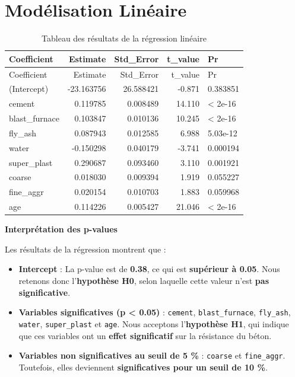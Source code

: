 \documentclass[
  12pt,
]{article}
\providecommand{\tightlist}{%
  \setlength{\itemsep}{0pt}\setlength{\parskip}{0pt}}
\begin{document}
\newpage

\section{Modélisation Linéaire}\label{moduxe9lisation-linuxe9aire}

\begin{longtable}[]{@{}lrrrl@{}}
\caption{Tableau des résultats de la régression linéaire}\tabularnewline
\toprule\noalign{}
Coefficient & Estimate & Std\_Error & t\_value & Pr \\
\midrule\noalign{}
\endfirsthead
\toprule\noalign{}
Coefficient & Estimate & Std\_Error & t\_value & Pr \\
\midrule\noalign{}
\endhead
\bottomrule\noalign{}
\endlastfoot
(Intercept) & -23.163756 & 26.588421 & -0.871 & 0.383851 \\
cement & 0.119785 & 0.008489 & 14.110 & \textless{} 2e-16 \\
blast\_furnace & 0.103847 & 0.010136 & 10.245 & \textless{} 2e-16 \\
fly\_ash & 0.087943 & 0.012585 & 6.988 & 5.03e-12 \\
water & -0.150298 & 0.040179 & -3.741 & 0.000194 \\
super\_plast & 0.290687 & 0.093460 & 3.110 & 0.001921 \\
coarse & 0.018030 & 0.009394 & 1.919 & 0.055227 \\
fine\_aggr & 0.020154 & 0.010703 & 1.883 & 0.059968 \\
age & 0.114226 & 0.005427 & 21.046 & \textless{} 2e-16 \\
\end{longtable}

\textbf{Interprétation des p-values}

Les résultats de la régression montrent que :

\begin{itemize}
\tightlist
\item
  \textbf{Intercept} : La p-value est de \textbf{0.38}, ce qui est
  \textbf{supérieur à 0.05}. Nous retenons donc l'\textbf{hypothèse H0},
  selon laquelle cette valeur n'est \textbf{pas significative}.
\item
  \textbf{Variables significatives (p \textless{} 0.05)} :
  \texttt{cement}, \texttt{blast\_furnace}, \texttt{fly\_ash},
  \texttt{water}, \texttt{super\_plast} et \texttt{age}. Nous acceptons
  l'\textbf{hypothèse H1}, qui indique que ces variables ont un
  \textbf{effet significatif} sur la résistance du béton.
\item
  \textbf{Variables non significatives au seuil de 5 \%} :
  \texttt{coarse} et \texttt{fine\_aggr}. Toutefois, elles deviennent
  \textbf{significatives pour un seuil de 10 \%}.
\end{itemize}
\end{document}
